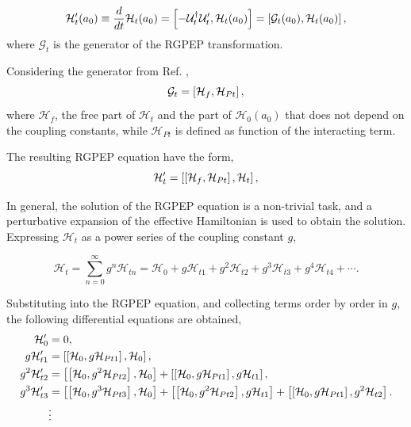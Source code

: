 \documentclass[11pt,a4paper,twoside,pdf]{article}
\numberwithin{equation}{section}
\begin{document}
\begin{equation}
    \mathcal{H}_t^\prime (a_0) \equiv \frac{d}{dt}\mathcal{H}_t(a_0) = 
    \left[ -\mathcal{U}_t^\dagger \mathcal{U}_t^\prime, \mathcal{H}_t(a_0) \right] 
    = \left[ \mathcal{G}_t(a_0), \mathcal{H}_t(a_0) \right],
\end{equation}
where $\mathcal{G}_t$ is the generator of the RGPEP transformation. 

Considering the generator from Ref. \cite{PEP},
\begin{equation}
    \mathcal{G}_t = \left[ \mathcal{H}_f, \mathcal{H}_{Pt} \right],
\end{equation}
where $\mathcal{H}_f$, the free part of $\mathcal{H}_t$ and the part of 
$\mathcal{H}_0(a_0)$ that does not depend on the coupling constants, 
while $\mathcal{H}_{Pt}$ is defined as function of the interacting term. 

The resulting RGPEP equation have the form,
\begin{equation}
    \mathcal{H}_t^\prime =  \left[ \left[ \mathcal{H}_f, \mathcal{H}_{Pt} \right], \mathcal{H}_t \right],
\end{equation}

In general, the solution of the RGPEP equation is a non-trivial task, and a perturbative
expansion of the effective Hamiltonian is used to obtain the solution. Expressing  
$\mathcal{H}_t$ as a power series of the coupling constant $g$,

\begin{equation}
    \mathcal{H}_t = \sum_{n=0}^{\infty} g^n \mathcal{H}_{t n} = 
    \mathcal{H}_{0} + g \mathcal{H}_{t 1} + g^2 \mathcal{H}_{t 2} + g^3 \mathcal{H}_{t 3} +
    g^4 \mathcal{H}_{t 4} + \cdots.
\end{equation}

Substituting into the RGPEP equation, and collecting terms order by order in \( g \),
the following differential equations are obtained,
\begin{align}
        \mathcal{H}_{0}^\prime &= 0, \label{eq:diff_order0}\\
        g\mathcal{H}_{t 1}^\prime &= \left[ \left[ \mathcal{H}_0, g\mathcal{H}_{Pt 1} \right], 
        \mathcal{H}_{0} \right], \label{eq:diff_order1}\\
        g^2\mathcal{H}_{t 2}^\prime &= \left[ \left[ \mathcal{H}_0, g^2\mathcal{H}_{Pt 2} \right], 
        \mathcal{H}_{0} \right] + \left[ \left[ \mathcal{H}_0, g\mathcal{H}_{Pt 1} \right], 
        g\mathcal{H}_{t 1} \right], \\
        g^3\mathcal{H}_{t 3}^\prime &= \left[ \left[ \mathcal{H}_0, g^3\mathcal{H}_{Pt 3} \right], 
        \mathcal{H}_{0} \right] + \left[ \left[ \mathcal{H}_0, g^2\mathcal{H}_{Pt 2} \right], 
        g\mathcal{H}_{t 1} \right] + \left[ \left[ \mathcal{H}_0, g\mathcal{H}_{Pt 1} \right], 
        g^2\mathcal{H}_{t 2} \right]. \label{eq:diff_order3}\\
        &\vdots \nonumber
\end{align}
\end{document}
